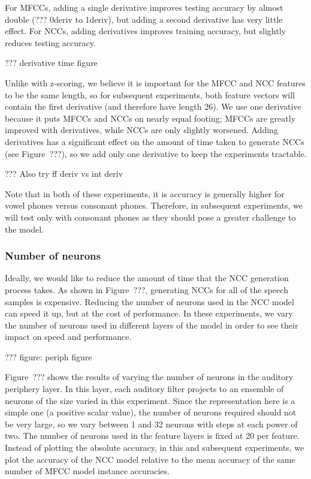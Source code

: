 For MFCCs, adding a single derivative
improves testing accuracy
by almost double
(??? 0deriv to 1deriv),
but adding a second derivative
has very little effect.
For NCCs, adding derivatives
improves training accuracy,
but slightly reduces testing accuracy.

??? derivative time figure

Unlike with z-scoring,
we believe it is important
for the MFCC and NCC features to
be the same length,
so for subsequent experiments,
both feature vectors
will contain the first derivative
(and therefore have length 26).
We use one derivative
because it puts MFCCs and NCCs
on nearly equal footing;
MFCCs are greatly improved
with derivatives,
while NCCs are only slightly worsened.
Adding derivatives
has a significant effect
on the amount of time taken to
generate NCCs
(see Figure~???),
so we add only one derivative
to keep the experiments tractable.

??? Also try ff deriv vs int deriv

Note that in both of these experiments,
it is accuracy is generally higher
for vowel phones versus consonant phones.
Therefore, in subsequent experiments,
we will test only with consonant phones
as they should pose a greater challenge
to the model.

\subsubsection{Number of neurons}

Ideally,
we would like to reduce the amount of time
that the NCC generation process takes.
As shown in Figure~???,
generating NCCs for all
of the speech samples is expensive.
Reducing the number of neurons
used in the NCC model
can speed it up,
but at the cost of performance.
In these experiments,
we vary the number of neurons used
in different layers of the model
in order to see their impact
on speed and performance.

??? figure: periph figure

Figure~??? shows the results of
varying the number of neurons
in the auditory periphery layer.
In this layer,
each auditory filter projects
to an ensemble of neurons
of the size varied in this experiment.
Since the representation here
is a simple one
(a positive scalar value),
the number of neurons required
should not be very large,
so we vary between
1 and 32 neurons with steps
at each power of two.
The number of neurons used
in the feature layers
is fixed at 20 per feature.
Instead of plotting the absolute accuracy,
in this and subsequent experiments,
we plot the accuracy of the NCC model
relative to the mean accuracy
of the same number
of MFCC model instance accuracies.

